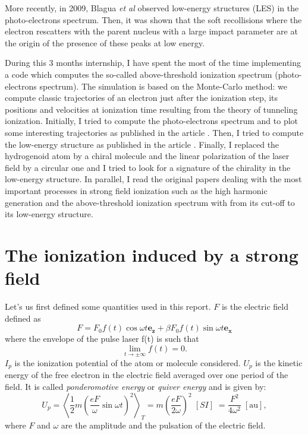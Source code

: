 \documentclass[a4paper]{article}
\begin{document}
\par
More recently, in 2009, Blagua \textit{et al} \cite{Blaga_2009, Quan_2009} observed low-energy structures (LES) in the photo-electrons spectrum. Then, it was shown \cite{Faisal_2009,Liu_2010,Yan_2010,Liu_2011,Kastner_2012_soft} that the soft recollisions where the electron rescatters with the parent nucleus with a large impact parameter are at the origin of the presence of these peaks at low energy.
\par
During this 3 months internship, I have spent the most of the time implementing a code which computes the so-called above-threshold ionization spectrum (photo-electrons spectrum). The simulation is based on the Monte-Carlo method: we compute classic trajectories of an electron just after the ionization step, its positions and velocities at ionization time resulting from the theory of tunneling ionization. 
Initially, I tried to compute the photo-electrons spectrum and to plot some interesting trajectories as published in the article \cite{Hu_1997}. 
Then, I tried to compute the low-energy structure as published in the article \cite{Kastner_2012_pulse}.
Finally, I replaced the hydrogenoid atom by a chiral molecule and the linear polarization of the laser field by a circular one and I tried to look for a signature of the chirality in the low-energy structure.
In parallel, I read the original papers dealing with the most important processes in strong field ionization such as the high harmonic generation and the above-threshold ionization spectrum with from its cut-off to its low-energy structure.


\section{The ionization induced by a strong field}
Let's us first defined some quantities used in this report. $F$ is the electric field defined as
\begin{equation}
\label{electric_field}
F=F_{0} f(t)\cos{\omega t} \mathbf{e_{z}} + \beta F_{0} f(t)\sin{\omega t} \mathbf{e_{x}}
\end{equation}
where the envelope of the pulse laser f(t) is such that
\begin{equation}
\label{envelope}
 \lim_{t\to\pm\infty} f(t)=0.
\end{equation}
$I_{p}$ is the ionization potential of the atom or molecule considered. $U_{p}$ is the kinetic energy of the free electron in the electric field averaged over one period of the field. It is called \textit{ponderomotive energy} or \textit{quiver energy} and is given by:
\begin{equation}
U_{p}=\left< \frac{1}{2}m \left(\frac{eF}{\omega}\sin{\omega t} \right)^{2} \right>_{T} = m \left( \frac{eF}{2\omega} \right)^{2} \; [SI] \; = \frac{F^{2}}{4\omega^{2}} \; [\text{au}],
\end{equation}  
where $F$ and $\omega$ are the amplitude and the pulsation of the electric field.
\end{document}
